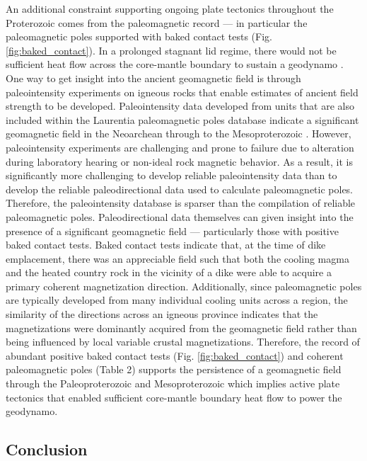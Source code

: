 \documentclass[twocolumn, switch]{article} %
\begin{document}
An additional constraint supporting ongoing plate tectonics throughout the Proterozoic comes from the paleomagnetic record --- in particular the paleomagnetic poles supported with baked contact tests (Fig. \ref{fig:baked_contact}). In a prolonged stagnant lid regime, there would not be sufficient heat flow across the core-mantle boundary to sustain a geodynamo \citep{Nimmo2000a, Buffett2000b}. One way to get insight into the ancient geomagnetic field is through paleointensity experiments on igneous rocks that enable estimates of ancient field strength to be developed.  Paleointensity data developed from units that are also included within the Laurentia paleomagnetic poles database indicate a significant geomagnetic field in the Neoarchean \citep{Selkin2000a} through to the Mesoproterozoic \citep{Macouin2006a, Sprain2018a}. However, paleointensity experiments are challenging and prone to failure due to alteration during laboratory hearing or non-ideal rock magnetic behavior. As a result, it is significantly more challenging to develop reliable paleointensity data than to develop the reliable paleodirectional data used to calculate paleomagnetic poles. Therefore, the paleointensity database is sparser than the compilation of reliable paleomagnetic poles. Paleodirectional data themselves can given insight into the presence of a significant geomagnetic field --- particularly those with positive baked contact tests. Baked contact tests indicate that, at the time of dike emplacement, there was an appreciable field such that both the cooling magma and the heated country rock in the vicinity of a dike were able to acquire a primary coherent magnetization direction. Additionally, since paleomagnetic poles are typically developed from many individual cooling units across a region, the similarity of the directions across an igneous province indicates that the magnetizations were dominantly acquired from the geomagnetic field rather than being influenced by local variable crustal magnetizations.  Therefore, the record of abundant positive baked contact tests (Fig. \ref{fig:baked_contact}) and coherent paleomagnetic poles (Table 2) supports the persistence of a geomagnetic field through the Paleoproterozoic and Mesoproterozoic which implies active plate tectonics that enabled sufficient core-mantle boundary heat flow to power the geodynamo.

\subsection{Conclusion}
\end{document}

